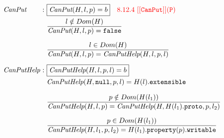 \documentclass[a4paper, leqno]{amsart}
\def\inred{\color{red}}
\newcommand{\nullK}{{\tt null}}
\newcommand{\false}{{\tt false}}
\newcommand{\bool}{\emph{Bool}}
\newcommand{\loc}{\emph{Loc}}
\begin{document}
{\[\begin{array}{l@{}l@{}ll}
\emph{CanPut} & \ : \ & \fbox{$\emph{CanPut}(H,l,p)=b$}
\quad{\inred 8.12.4\ {\tt[[CanPut]](P)}}\\[.5em]
 & \ \ & \frac{
    \begin{matrix}
       l \notin Dom(H)
    \end{matrix}}{
    \begin{matrix}
       \emph{CanPut}(H,l,p)=\false
    \end{matrix}} & \\[1.5em]
 & \ \ & \frac{
    \begin{matrix}
       l \in Dom(H)
    \end{matrix}}{
    \begin{matrix}
       \emph{CanPut}(H,l,p)=\emph{CanPutHelp}(H,l,p,l)
    \end{matrix}} & \\[1.5em]

\emph{CanPutHelp} & \ : \ & \fbox{$\emph{CanPutHelp}(H,l,p,l) = b$}\\[.5em]
 & \  \ & \emph{CanPutHelp}(H,\nullK,p,l) = H(l).{\tt extensible} & \\[1em]
 & \ \ & \frac{
    \begin{matrix}
       p \notin Dom(H(l_1))
    \end{matrix}}{
    \begin{matrix}
       \emph{CanPutHelp}(H,l,p)=\emph{CanPutHelp}(H,H(l_1).{\tt proto},p,l_2)
    \end{matrix}} & \\[1.5em]
 & \ \ & \frac{
    \begin{matrix}
      p \in Dom(H(l_1))
    \end{matrix}}{
    \begin{matrix}
      \emph{CanPutHelp}(H,l_1,p,l_2)=H(l_1).{\tt property}(p).{\tt writable}
    \end{matrix}} & \\[1.5em]


\end{array}\]}
\end{document}
